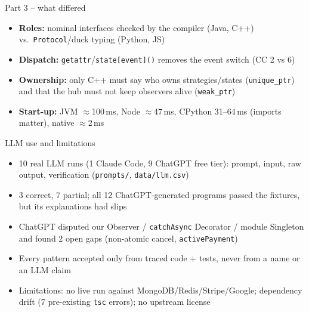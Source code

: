 \documentclass[aspectratio=169,10pt]{beamer}
\begin{document}
\begin{frame}{Part 3 -- what differed}
\begin{itemize}
\item \textbf{Roles:} nominal interfaces checked by the compiler (Java, C++) vs.\ \texttt{Protocol}/duck typing (Python, JS)
\item \textbf{Dispatch:} \texttt{getattr}/\texttt{state[event]()} removes the event switch (CC 2 vs 6)
\item \textbf{Ownership:} only C++ must say who owns strategies/states (\texttt{unique\_ptr}) and that the hub must not keep observers alive (\texttt{weak\_ptr})
\item \textbf{Start-up:} JVM $\approx$100\,ms, Node $\approx$47\,ms, CPython 31--64\,ms (imports matter), native $\approx$2\,ms
\end{itemize}
\end{frame}

\begin{frame}{LLM use and limitations}
\begin{itemize}
\item 10 real LLM runs (1 Claude Code, 9 ChatGPT free tier): prompt, input, raw output, verification (\texttt{prompts/}, \texttt{data/llm.csv})
\item 3 correct, 7 partial; all 12 ChatGPT-generated programs passed the fixtures, but its explanations had slips
\item ChatGPT disputed our Observer / \texttt{catchAsync} Decorator / module Singleton and found 2 open gaps (non-atomic cancel, \texttt{activePayment})
\item Every pattern accepted only from traced code + tests, never from a name or an LLM claim
\item Limitations: no live run against MongoDB/Redis/Stripe/Google; dependency drift (7 pre-existing \texttt{tsc} errors); no upstream license
\end{itemize}
\end{frame}
\end{document}
